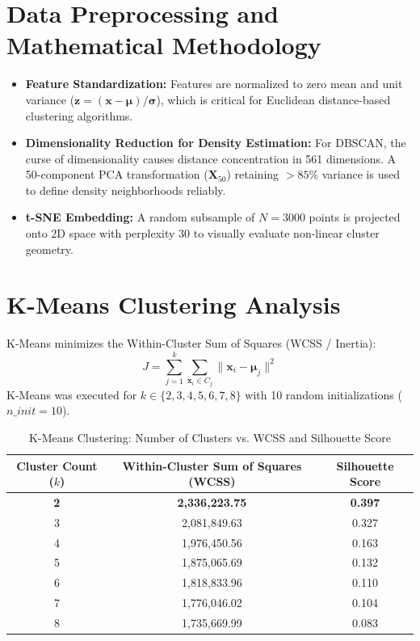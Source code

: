 \documentclass[12pt,a4paper]{article}
\begin{document}
\section{Data Preprocessing and Mathematical Methodology}
\begin{itemize}
    \item \textbf{Feature Standardization:} Features are normalized to zero mean and unit variance ($\mathbf{z} = (\mathbf{x} - \boldsymbol{\mu}) / \boldsymbol{\sigma}$), which is critical for Euclidean distance-based clustering algorithms.
    \item \textbf{Dimensionality Reduction for Density Estimation:} For DBSCAN, the curse of dimensionality causes distance concentration in 561 dimensions. A 50-component PCA transformation ($\mathbf{X}_{50}$) retaining $>85\%$ variance is used to define density neighborhoods reliably.
    \item \textbf{t-SNE Embedding:} A random subsample of $N=3000$ points is projected onto 2D space with perplexity 30 to visually evaluate non-linear cluster geometry.
\end{itemize}

\section{K-Means Clustering Analysis}
K-Means minimizes the Within-Cluster Sum of Squares (WCSS / Inertia):
\begin{equation}
J = \sum_{j=1}^k \sum_{\mathbf{x}_i \in C_j} \|\mathbf{x}_i - \boldsymbol{\mu}_j\|^2
\end{equation}
K-Means was executed for $k \in \{2, 3, 4, 5, 6, 7, 8\}$ with 10 random initializations ($n\_init=10$).

\begin{table}[H]
\centering
\caption{K-Means Clustering: Number of Clusters vs. WCSS and Silhouette Score}
\label{tab:kmeans_metrics}
\begin{tabular}{|c|c|c|}
\hline
\textbf{Cluster Count ($k$)} & \textbf{Within-Cluster Sum of Squares (WCSS)} & \textbf{Silhouette Score}\\ \hline
\textbf{2} & \textbf{2,336,223.75} & \textbf{0.397}\\ \hline
3 & 2,081,849.63 & 0.327\\ \hline
4 & 1,976,450.56 & 0.163\\ \hline
5 & 1,875,065.69 & 0.132\\ \hline
6 & 1,818,833.96 & 0.110\\ \hline
7 & 1,776,046.02 & 0.104\\ \hline
8 & 1,735,669.99 & 0.083\\ \hline
\end{tabular}
\end{table}
\end{document}

